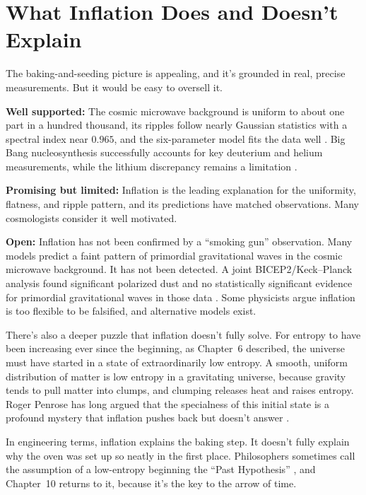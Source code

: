 \section{What Inflation Does and Doesn't Explain}

The baking-and-seeding picture is appealing, and it's grounded in real, precise measurements. But it would be easy to oversell it.

\begin{researchnotebox}
\textbf{Well supported:} The cosmic microwave background is uniform to about one part in a hundred thousand, its ripples follow nearly Gaussian statistics with a spectral index near \(0.965\), and the six-parameter model fits the data well \cite{planck2018}. Big Bang nucleosynthesis successfully accounts for key deuterium and helium measurements, while the lithium discrepancy remains a limitation \cite{pitrou2018nucleosynthesis}.

\textbf{Promising but limited:} Inflation is the leading explanation for the uniformity, flatness, and ripple pattern, and its predictions have matched observations. Many cosmologists consider it well motivated.

\textbf{Open:} Inflation has not been confirmed by a ``smoking gun'' observation. Many models predict a faint pattern of primordial gravitational waves in the cosmic microwave background. It has not been detected. A joint BICEP2/Keck--Planck analysis found significant polarized dust and no statistically significant evidence for primordial gravitational waves in those data \cite{bicep2015joint}. Some physicists argue inflation is too flexible to be falsified, and alternative models exist.
\end{researchnotebox}

There's also a deeper puzzle that inflation doesn't fully solve. For entropy to have been increasing ever since the beginning, as Chapter~6 described, the universe must have started in a state of extraordinarily low entropy. A smooth, uniform distribution of matter is low entropy in a gravitating universe, because gravity tends to pull matter into clumps, and clumping releases heat and raises entropy. Roger Penrose has long argued that the specialness of this initial state is a profound mystery that inflation pushes back but doesn't answer \cite{penrose1989}.

In engineering terms, inflation explains the baking step. It doesn't fully explain why the oven was set up so neatly in the first place. Philosophers sometimes call the assumption of a low-entropy beginning the ``Past Hypothesis'' \cite{albert2000}, and Chapter~10 returns to it, because it's the key to the arrow of time.


